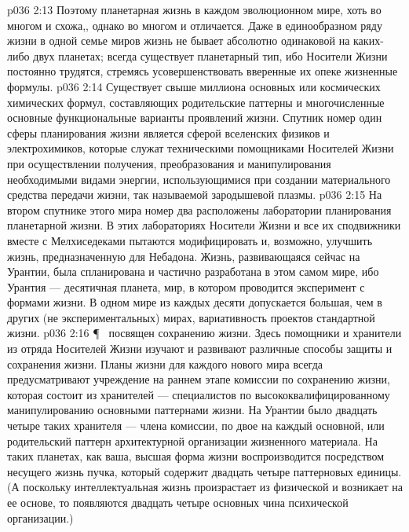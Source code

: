 \vs p036 2:13 Поэтому планетарная жизнь в каждом эволюционном мире, хоть во многом и схожа,, однако во многом и отличается. Даже в единообразном ряду жизни в одной семье миров жизнь не бывает абсолютно одинаковой на каких\hyp{}либо двух планетах; всегда существует планетарный тип, ибо Носители Жизни постоянно трудятся, стремясь усовершенствовать вверенные их опеке жизненные формулы.
\vs p036 2:14 Существует свыше миллиона основных или космических химических формул, составляющих родительские паттерны и многочисленные основные функциональные варианты проявлений жизни. Спутник номер один сферы планирования жизни является сферой вселенских физиков и электрохимиков, которые служат техническими помощниками Носителей Жизни при осуществлении получения, преобразования и манипулирования необходимыми видами энергии, использующимися при создании материального средства передачи жизни, так называемой зародышевой плазмы.
\vs p036 2:15 На втором спутнике этого мира номер два расположены лаборатории планирования планетарной жизни. В этих лабораториях Носители Жизни и все их сподвижники вместе с Мелхиседеками пытаются модифицировать и, возможно, улучшить жизнь, предназначенную для  Небадона. Жизнь, развивающаяся сейчас на Урантии, была спланирована и частично разработана в этом самом мире, ибо Урантия --- десятичная планета, мир, в котором проводится эксперимент с формами жизни. В одном мире из каждых десяти допускается большая, чем в других (не экспериментальных) мирах, вариативность проектов стандартной жизни.
\vs p036 2:16 \P\  посвящен сохранению жизни. Здесь помощники и хранители из отряда Носителей Жизни изучают и развивают различные способы защиты и сохранения жизни. Планы жизни для каждого нового мира всегда предусматривают учреждение на раннем этапе комиссии по сохранению жизни, которая состоит из хранителей --- специалистов по высококвалифицированному манипулированию основными паттернами жизни. На Урантии было двадцать четыре таких хранителя --- члена комиссии, по двое на каждый основной, или родительский паттерн архитектурной организации жизненного материала. На таких планетах, как ваша, высшая форма жизни воспроизводится посредством несущего жизнь пучка, который содержит двадцать четыре паттерновых единицы. (А поскольку интеллектуальная жизнь произрастает из физической и возникает на ее основе, то появляются двадцать четыре основных чина психической организации.)
